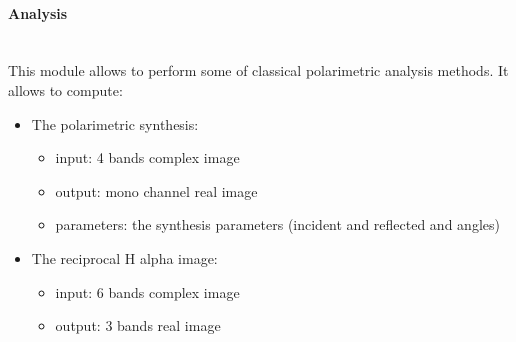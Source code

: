 \paragraph{Analysis} \\

This module allows to perform some of classical polarimetric analysis methods. It allows to compute:
\begin{itemize}
\item The polarimetric synthesis:
\begin{itemize}
\item input: 4 bands complex image
\item output: mono channel real image 
\item parameters: the synthesis parameters (incident and reflected \psy and \khi angles)
\end{itemize}
\item The reciprocal H alpha image:
\begin{itemize}
\item input: 6 bands complex image
\item output: 3 bands real image 
\end{itemize}
\end{itemize}

